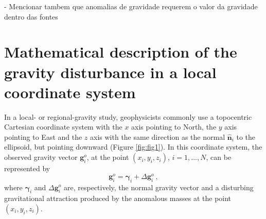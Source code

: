 \documentclass[manuscript]{geophysics}
\begin{document}
- Mencionar tambem que anomalias de gravidade requerem o
valor da gravidade dentro das fontes


\section{Mathematical description of the gravity disturbance in a local coordinate system}

In a local- or regional-gravity study, 
geophysicists commonly use a topocentric Cartesian coordinate system
with the $x$ axis pointing to North, the $y$ axis pointing to East and 
the $z$ axis with the same direction as the normal $\hat{\mathbf{n}}_{i}$
to the ellipsoid, but pointing downward (Figure \ref{fig:fig1}).
In this coordinate system, the observed gravity vector
$\mathbf{g}^{o}_{i}$, at the point $(x_{i}, y_{i}, z_{i})$, 
$i = 1, ..., N$, can be represented by
\begin{equation}
\mathbf{g}^{o}_{i} = \boldsymbol{\gamma}_{i} + \Delta \mathbf{g}^{o}_{i} \: ,
\label{eq:gravity-vector}
\end{equation}
where $\boldsymbol{\gamma}_{i}$ and $\Delta \mathbf{g}^{o}_{i}$
are, respectively, the normal gravity vector and a
disturbing gravitational attraction produced by the anomalous 
masses at the point $(x_{i}, y_{i}, z_{i})$.
\end{document}

